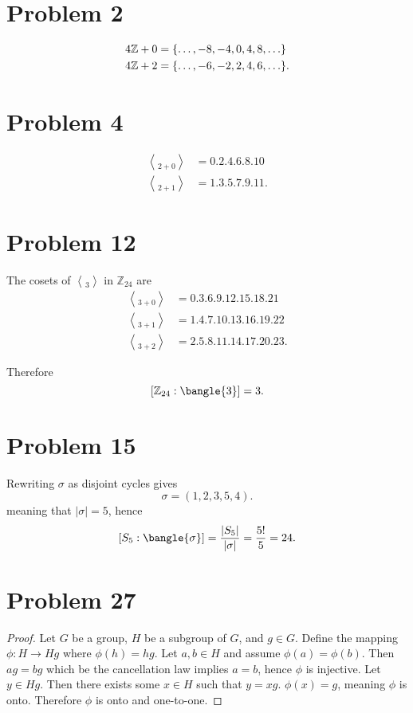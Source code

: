\documentclass[12pt]{extarticle}
\begin{document}
\DeclarePairedDelimiter\bangle\langle\rangle


\section*{Problem 2}
\begin{align*}
	4 \mathbb{Z} + 0 &= \qty{\ldots, -8, -4, 0, 4, 8, \ldots} \\
	4 \mathbb{Z} + 2 &= \qty{\ldots, -6, -2, 2, 4, 6, \ldots}
.\end{align*}

\section*{Problem 4}
\begin{align*}
	\bangle{2} + 0 &= \qty{0, 2, 4, 6, 8, 10} \\
	\bangle{2} + 1 &= \qty{1, 3, 5, 7, 9, 11}
.\end{align*}

\section*{Problem 12}
The cosets of $\bangle{3}$ in $\mathbb{Z}_{24}$ are
\begin{align*}
	\bangle{3} + 0 &= \qty{0,3,6,9,12,15,18,21} \\
	\bangle{3} + 1 &= \qty{1,4,7,10,13,16,19,22} \\
	\bangle{3} + 2 &= \qty{2,5,8,11,14,17,20,23}
.\end{align*}

Therefore
\[
	\qty[\mathbb{Z}_{24} : \bangle{3}] = 3
.\]

\section*{Problem 15}
Rewriting $\sigma$ as disjoint cycles gives
\[
	\sigma = (1, 2, 3, 5, 4)
.\]
meaning that $|\sigma| = 5$, hence
\[
	\qty[S_5 : \bangle{\sigma}] = \frac{|S_5|}{|\sigma|} = \frac{5!}{5} = 24
.\]

\section*{Problem 27}
\begin{proof}
	Let $G$ be a group, $H$ be a subgroup of $G$, and $g \in G$. Define the mapping $\phi : H \to Hg$ where $\phi(h) = hg$. Let $a,b \in H$ and assume $\phi(a) = \phi(b)$. Then $ag = bg$ which be the cancellation law implies $a = b$, hence $\phi$ is injective. Let $y \in Hg$. Then there exists some $x \in H$ such that $y = xg$. $\phi(x) = g$, meaning $\phi$ is onto. Therefore $\phi$ is onto and one-to-one.
\end{proof}
\end{document}

